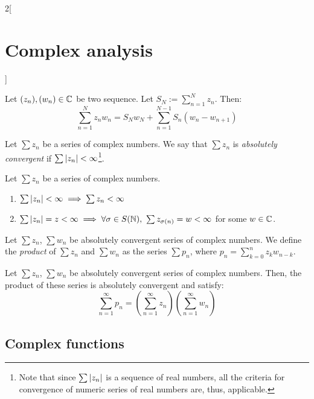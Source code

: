 \documentclass[../../../main_math.tex]{subfiles}
\begin{document}
\begin{multicols}{2}[\section{Complex analysis}]
\begin{proposition}
\begin{enumerate}
    \end{enumerate}
  \end{proposition}
  \begin{lemma}
    Let $(z_n),(w_n)\in\mathbb{C}$ be two sequence. Let $S_N:=\sum_{n=1}^N z_n$. Then:
    \begin{equation*}
      \sum_{n=1}^N z_nw_n=S_Nw_N+\sum_{n=1}^{N-1}S_n(w_n-w_{n+1})
    \end{equation*}
  \end{lemma}
  \begin{definition}
    Let $\sum z_n$ be a series of complex numbers. We say that $\sum z_n$ is \emph{absolutely convergent} if $\sum \abs{z_n}<\infty$\footnote{Note that since $\sum \abs{z_n}$ is a sequence of real numbers, all the criteria for convergence of numeric series of real numbers are, thus, applicable.}.
  \end{definition}
  \begin{proposition}
    Let $\sum z_n$ be a series of complex numbers.
    \begin{enumerate}
      \item $\sum \abs{z_n}<\infty\implies\sum z_n<\infty$
      \item $\sum \abs{z_n}=z<\infty\implies\forall\sigma\in S(\mathbb{N}),\ \sum z_{\sigma (n)}=w<\infty$ for some $w\in\mathbb{C}$.
    \end{enumerate}
  \end{proposition}
  \begin{definition}
    Let $\sum z_n$, $\sum w_n$ be absolutely convergent series of complex numbers. We define the \emph{product} of $\sum z_n$ and $\sum w_n$ as the series $\sum p_n$, where $p_n=\sum_{k=0}^nz_kw_{n-k}$.
  \end{definition}
  \begin{proposition}
    Let $\sum z_n$, $\sum w_n$ be absolutely convergent series of complex numbers. Then, the product of these series is absolutely convergent and satisfy: $$\sum_{n=1}^\infty p_n=\left(\sum_{n=1}^\infty z_n\right)\left(\sum_{n=1}^\infty w_n\right)$$
  \end{proposition}
  \subsection{Complex functions}

\end{multicols}
\end{document}
